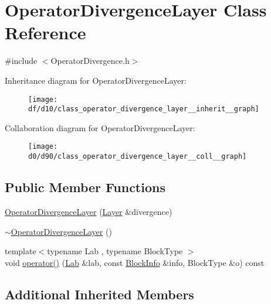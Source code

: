 \hypertarget{class_operator_divergence_layer}{}\section{Operator\+Divergence\+Layer Class Reference}
\label{class_operator_divergence_layer}


{\ttfamily \#include $<$Operator\+Divergence.\+h$>$}



Inheritance diagram for Operator\+Divergence\+Layer\+:\nopagebreak
\begin{figure}[H]
\begin{center}
\leavevmode
\texttt{[image: df/d10/class\_operator\_divergence\_layer\_\_inherit\_\_graph]}
\end{center}
\end{figure}


Collaboration diagram for Operator\+Divergence\+Layer\+:\nopagebreak
\begin{figure}[H]
\begin{center}
\leavevmode
\texttt{[image: d0/d90/class\_operator\_divergence\_layer\_\_coll\_\_graph]}
\end{center}
\end{figure}
\subsection*{Public Member Functions}
\begin{DoxyCompactItemize}
\item 
\hyperlink{class_operator_divergence_layer_abae01528fbc5323cfeab708f5942fc0c}{Operator\+Divergence\+Layer} (\hyperlink{struct_layer}{Layer} \&divergence)
\item 
\hyperlink{class_operator_divergence_layer_ab879de5dd496c4f07b8c6c2c632050f2}{$\sim$\+Operator\+Divergence\+Layer} ()
\item 
{\footnotesize template$<$typename Lab , typename Block\+Type $>$ }\\void \hyperlink{class_operator_divergence_layer_a764c3ca9116897888c989ff440460e04}{operator()} (\hyperlink{_definitions_8h_ad6f951af9a2a6ebc1975404882b34314}{Lab} \&lab, const \hyperlink{struct_block_info}{Block\+Info} \&info, Block\+Type \&o) const 
\end{DoxyCompactItemize}
\subsection*{Additional Inherited Members}


